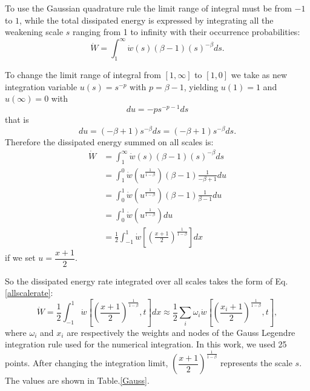 \documentclass[3p,times,procedia,number]{elsarticle}
\begin{document}
To use the Gaussian quadrature rule the limit range of integral must be from $-1$ to $1$, while the total dissipated energy  is expressed by integrating all the weakening scale $s$ ranging from 1 to infinity with their occurrence probabilities:
$$\dot{W}=\int_{1}^{\infty}\dot{w}(s) (\beta-1)(s)^{-\beta}ds.$$

\noindent
To change the limit range of integral from $[1,\infty]$ to $[1,0]$ we take as new integration variable
$u(s)= s^{-p}$ with $p=\beta-1$, yielding $u(1)=1$ and  $u(\infty)=0$ with
$$du=-ps^{-p-1}ds$$ 
that is
$$du=(-\beta+1) s^{-\beta}ds=(-\beta+1)s^{-\beta} ds.$$
Therefore the dissipated energy summed on all scales is:
\begin{equation}
	\begin{split}
		\dot{W}&=\int_{1}^{\infty}\dot{w}(s) (\beta-1)(s)^{-\beta}ds
		\\&=\int_{1}^{0}\dot{w}\left( u^{\frac{1}{1-\beta}}\right) (\beta-1) \frac{1}{-\beta+1}du
		\\&=\int_{0}^{1}\dot{w}\left( u^{\frac{1}{1-\beta}}\right) (\beta-1) \frac{1}{\beta-1}du
		\\&=\int_{0}^{1}\dot{w}\left( u^{\frac{1}{1-\beta}}\right)du
		\\&=\frac{1}{2}\int_{-1}^{1}\dot{w}\left[  \left( \frac{x+1}{2}\right) ^{\frac{1}{1-\beta}}\right] dx
	\end{split}
	\label{allscale}
\end{equation}
if we set $u=\dfrac{x+1}{2}$.

So the dissipated energy rate integrated over all scales takes the form of Eq.\eqref{allscalerate}:
\begin{equation}
	\dot{W}=\frac{1}{2}\int_{-1}^{1}\dot{w}\left[  \left( \frac{x+1}{2}\right) ^{\frac{1}{1-\beta}},t\right] dx\approx\frac{1}{2}\sum_{i}\omega_i\dot{w}\left[  \left( \frac{x_i+1}{2}\right) ^{\frac{1}{1-\beta}},t\right],
	\label{allscalerate}
\end{equation}
where $\omega_i$ and $x_i$ are respectively the weights and nodes of the Gauss Legendre integration rule used for the numerical integration. In this work, we used 25 points\cite{legendre}. After changing the integration limit, $\left( \dfrac{x+1}{2}\right) ^{\frac{1}{1-\beta}}$ represents the scale $s$. The values are shown in Table.\ref{Gauss}. 
\end{document}
